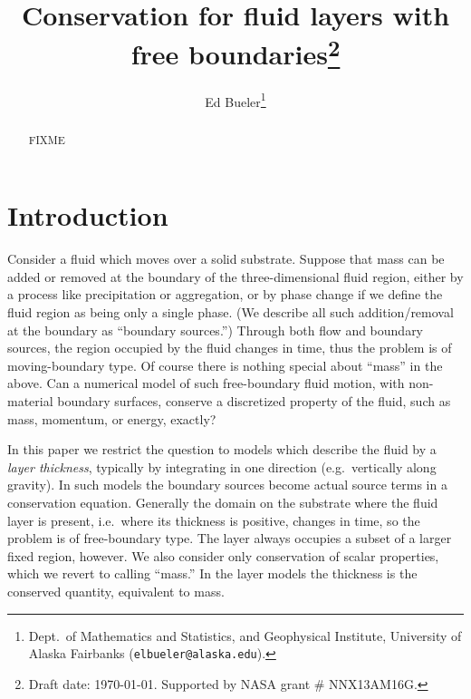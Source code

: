 \documentclass[final,leqno,onefignum,onetabnum]{siamltex1213bueler}
\title{Conservation for fluid layers with free boundaries\thanks{Draft date: \today.  Supported by NASA grant \# NNX13AM16G.}}
\author{Ed Bueler\thanks{Dept.~of Mathematics and Statistics, and Geophysical Institute, University of Alaska Fairbanks (\texttt{elbueler@alaska.edu}).}}
\begin{document}
\maketitle
{}%

\begin{abstract}
FIXME
\end{abstract}




\pagestyle{myheadings}
\thispagestyle{plain}


\section{Introduction}  \label{sec:intro}

Consider a fluid which moves over a solid substrate.  Suppose that mass can be added or removed at the boundary of the three-dimensional fluid region, either by a process like precipitation or aggregation, or by phase change if we define the fluid region as being only a single phase.  (We describe all such addition/removal at the boundary as ``boundary sources.'')  Through both flow and boundary sources, the region occupied by the fluid changes in time, thus the problem is of moving-boundary type.  Of course there is nothing special about ``mass'' in the above.  Can a numerical model of such free-boundary fluid motion, with non-material boundary surfaces, conserve a discretized property of the fluid, such as mass, momentum, or energy, exactly?

In this paper we restrict the question to models which describe the fluid by a \emph{layer thickness}, typically by integrating in one direction (e.g.~vertically along gravity).  In such models the boundary sources become actual source terms in a conservation equation.  Generally the domain on the substrate where the fluid layer is present, i.e.~where its thickness is positive, changes in time, so the problem is of free-boundary type.  The layer always occupies a subset of a larger fixed region, however.  We also consider only conservation of scalar properties, which we revert to calling ``mass.''  In the layer models the thickness is the conserved quantity, equivalent to mass.
\end{document}
